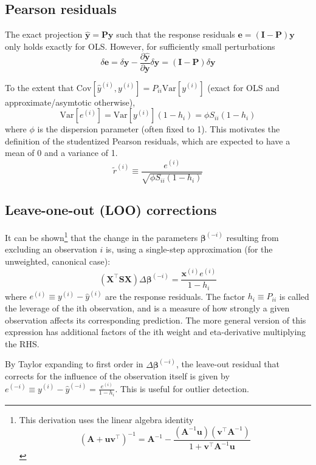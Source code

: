 \documentclass{article}
\newcommand{\bbeta}{\boldsymbol{\beta}}
\begin{document}
\subsection{Pearson residuals}

The exact projection \(\hat{\mathbf{y}} = \mathbf{P y}\) such that the response
residuals \(\mathbf{e} = (\mathbf{I} - \mathbf{P})\mathbf{y} \) only holds
exactly for OLS. However, for sufficiently small perturbations
\[ \delta \mathbf{e} = \delta\mathbf{y} - \frac{\partial \hat{\mathbf{y}}}{\partial \mathbf{y}} \delta \mathbf{y} = (\mathbf{I} - \mathbf{P}) \delta \mathbf{y} \]

To the extent that \(\mathrm{Cov}[\hat{y}^{(i)}, y^{(i)}] = P_{ii}
\mathrm{Var}[y^{(i)}] \) (exact for OLS and approximate/asymtotic otherwise),
\[ \mathrm{Var}[e^{(i)}] = \mathrm{Var}[y^{(i)}] (1 - h_i) = \phi S_{ii} (1-h_i) \]
where \(\phi\) is the dispersion parameter (often fixed to 1). This motivates
the definition of the studentized Pearson residuals, which are expected to have
a mean of 0 and a variance of 1.
\[ \tilde{r}^{(i)} \equiv \frac{e^{(i)}}{\sqrt{\phi S_{ii} (1 - h_i)}} \]

\subsection{Leave-one-out (LOO) corrections}

It can be shown\footnote{
    This derivation uses the linear algebra identity
    \[ \left(\mathbf{A} + \mathbf{u}\mathbf{v}^\intercal\right)^{-1} = \mathbf{A}^{-1} - \frac{\left(\mathbf{A}^{-1}\mathbf{u}\right) \left(\mathbf{v}^\intercal \mathbf{A}^{-1} \right)}{1 + \mathbf{v}^\intercal\mathbf{A}^{-1}\mathbf{u}}\]
} that the change in the parameters
\(\bbeta^{(-i)}\) resulting from excluding an observation \(i\)
is, using a single-step approximation (for the unweighted, canonical case):
\[\left(\mathbf{X}^\intercal \mathbf{S} \mathbf{X} \right) \Delta \bbeta^{(-i)} = \frac{\mathbf{x}^{(i)} e^{(i)}}{1 - h_{i}} \]
where \(e^{(i)}\equiv y^{(i)} - \hat{y}^{(i)}\) are the response residuals.
The factor \(h_{i} \equiv P_{ii} \) is called the leverage of the
ith observation, and is a measure of how strongly a given observation affects
its corresponding prediction. The more general version of this expression has
additional factors of the ith weight and eta-derivative multiplying the RHS.

By Taylor expanding to first order in \(\Delta \bbeta^{(-i)}\), the leave-out residual that corrects for the influence of the observation itself is given by \(e^{(-i)} \equiv y^{(i)} - \hat{y}^{(-i)} = \frac{e^{(i)}}{1 - h_i}\). This is useful for outlier detection.
\end{document}
